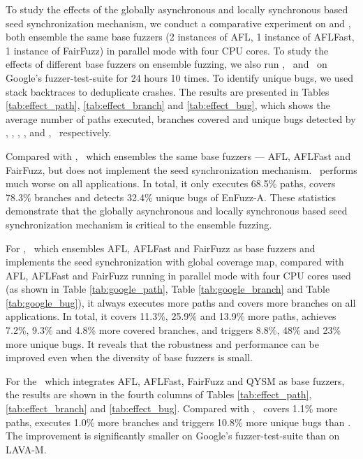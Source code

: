 To study the effects of the globally asynchronous and locally synchronous based seed synchronization mechanism, we conduct a comparative experiment on \toolFour and \toolOne, both ensemble the same base fuzzers (2 instances of AFL, 1 instance of AFLFast, 1 instance of FairFuzz)  in parallel mode with four CPU cores.
To study the effects of different base fuzzers on ensemble fuzzing, we also run \toolFive, \toolTwo ~and \toolThree ~on Google's fuzzer-test-suite for 24 hours 10 times.
To identify unique bugs, we used stack backtraces to deduplicate crashes.
The results are presented in Tables \ref{tab:effect_path}, \ref{tab:effect_branch} and \ref{tab:effect_bug}, which shows the average number of paths executed, branches covered and unique bugs detected by \toolFour, \toolOne, \toolFive, \toolTwo, and \toolThree, ~respectively.
 
Compared with \toolOne, \toolFour ~which ensembles the same base fuzzers — AFL, AFLFast and FairFuzz, but does not implement the seed synchronization mechanism.
\toolFour ~performs much worse on all applications. 
In total, it only executes 68.5\% paths, covers 78.3\% branches and detects 32.4\% unique bugs of EnFuzz-A. 
These statistics demonstrate that the globally asynchronous and locally synchronous based seed synchronization mechanism is critical to the ensemble fuzzing. 

For \toolOne, ~which ensembles AFL, AFLFast and FairFuzz as base fuzzers and implements the seed synchronization with global coverage map, compared with AFL, AFLFast and FairFuzz running in parallel mode with four CPU cores used (as shown in Table \ref{tab:google_path}, Table \ref{tab:google_branch} and Table \ref{tab:google_bug}), it always executes more paths and covers more branches on all applications. In total, it covers 11.3\%, 25.9\% and 13.9\% more paths, achieves 7.2\%, 9.3\% and 4.8\% more covered branches, 
and triggers 8.8\%, 48\% and 23\% more unique bugs. It reveals that the robustness and performance can be improved even when the diversity of base fuzzers is small.


For the \toolFive ~which integrates AFL, AFLFast, FairFuzz and QYSM as base fuzzers, the results are shown in the fourth columns of Tables \ref{tab:effect_path},  \ref{tab:effect_branch} and  \ref{tab:effect_bug}.
Compared with \toolOne, \toolFive ~covers 1.1\% more paths, executes 1.0\% more branches and triggers 10.8\% more unique bugs than \toolOne. The improvement is significantly smaller on Google's fuzzer-test-suite than on LAVA-M.


